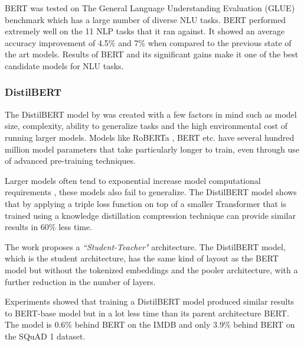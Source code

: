 \documentclass[a4paper,12pt]{report}
\begin{document}
			BERT was tested on The General Language Understanding Evaluation (GLUE) benchmark \citep{wang} which has a large number of diverse NLU tasks.
			BERT performed extremely well on the 11 NLP tasks that it ran against. It showed an average accuracy improvement of 4.5\% and 7\% when compared to the previous state of the art models. Results of BERT and its significant gains make it one of the best candidate models for NLU tasks.



	    \subsubsection{DistilBERT}\label{distilLitrev}
	    The DistilBERT model by \citep{distil} was created with a few factors in  mind such as model size, complexity, ability to generalize tasks and the high environmental cost of running larger models. Models like RoBERTa \citep{roberta}, BERT \citep{bert} etc. have several hundred million model parameters that take particularly longer to train, even through use of advanced pre-training techniques.

	    Larger models often tend to exponential increase model computational requirements \citep{schwarts}, these models also fail to generalize. The DistilBERT model shows that by applying a triple loss function on top of a smaller Transformer \citep{atayl} that is trained using a knowledge distillation compression technique \citep{knowledgeDistilation} can provide similar results in 60\% less time.

	    The work proposes a \textit{``Student-Teacher"} architecture. The DistilBERT model, which is the student architecture, has the same kind of layout as the BERT model but without the tokenized embeddings and the pooler architecture, with a further reduction in the number of layers.

	    Experiments showed that training a DistilBERT model produced similar results to BERT-base model but in a lot less time than its parent architecture BERT. The model is 0.6\% behind BERT on the IMDB and only 3.9\% behind BERT on the SQuAD 1 dataset.
\end{document}
